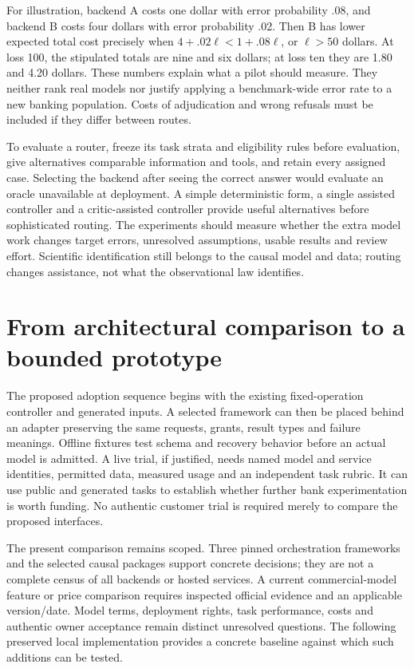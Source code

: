 For illustration, backend A costs one dollar with error probability .08,
and backend B costs four dollars with error probability .02. Then B has
lower expected total cost precisely when
$4+.02\ell<1+.08\ell$, or $\ell>50$ dollars. At loss 100, the stipulated
totals are nine and six dollars; at loss ten they are 1.80 and 4.20 dollars.
These numbers explain what a pilot should measure. They neither rank real
models nor justify applying a benchmark-wide error rate to a new banking
population. Costs of adjudication and wrong refusals must be included if
they differ between routes. \citep{exec14_l6_exact}

To evaluate a router, freeze its task strata and eligibility rules before
evaluation, give alternatives comparable information and tools, and retain
every assigned case. Selecting the backend after seeing the correct answer
would evaluate an oracle unavailable at deployment. A simple deterministic
form, a single assisted controller and a critic-assisted controller provide
useful alternatives before sophisticated routing. The experiments should
measure whether the extra model work changes target errors, unresolved
assumptions, usable results and review effort. Scientific identification
still belongs to the causal model and data; routing changes assistance,
not what the observational law identifies.

\section{From architectural comparison to a bounded prototype}

The proposed adoption sequence begins with the existing fixed-operation
controller and generated inputs. A selected framework can then be placed
behind an adapter preserving the same requests, grants, result types and
failure meanings. Offline fixtures test schema and recovery behavior before
an actual model is admitted. A live trial, if justified, needs named model
and service identities, permitted data, measured usage and an independent
task rubric. It can use public and generated tasks to establish whether
further bank experimentation is worth funding. No authentic customer
trial is required merely to compare the proposed interfaces.

The present comparison remains scoped. Three pinned orchestration
frameworks and the selected causal packages support concrete decisions;
they are not a complete census of all backends or hosted services. A
current commercial-model feature or price comparison requires inspected
official evidence and an applicable version/date. Model terms, deployment
rights, task performance, costs and authentic owner acceptance remain
distinct unresolved questions. The following preserved local implementation
provides a concrete baseline against which such additions can be tested.
\citep{exec14_l6_design,exec14_l6_local}

\label{exec14:l6-extension-end}
